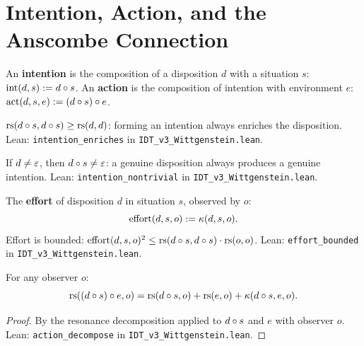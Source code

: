 \section{Intention, Action, and the Anscombe Connection}

\begin{definition}
\label{def:intention-action}
An \textbf{intention} is the composition of a disposition $d$ with a
situation $s$: $\mathrm{int}(d, s) := d \circ s$.
An \textbf{action} is the composition of intention with environment $e$:
$\mathrm{act}(d, s, e) := (d \circ s) \circ e$.
\end{definition}

\begin{theorem}
\label{thm:intention-enriches}
$\mathrm{rs}(d \circ s, d \circ s) \geq \mathrm{rs}(d, d)$: forming an intention
always enriches the disposition.
Lean: \texttt{intention\_enriches} in \texttt{IDT\_v3\_Wittgenstein.lean}.
\end{theorem}

\begin{theorem}
\label{thm:intention-nontrivial}
If $d \neq \varepsilon$, then $d \circ s \neq \varepsilon$: a genuine disposition
always produces a genuine intention.
Lean: \texttt{intention\_nontrivial} in \texttt{IDT\_v3\_Wittgenstein.lean}.
\end{theorem}

\begin{theorem}
\label{thm:effort-decompose}
The \textbf{effort} of disposition $d$ in situation $s$, observed by $o$:
\[
\mathrm{effort}(d, s, o) := \kappa(d, s, o).
\]
Effort is bounded: $\mathrm{effort}(d, s, o)^2 \leq
\mathrm{rs}(d \circ s, d \circ s) \cdot \mathrm{rs}(o, o)$.
Lean: \texttt{effort\_bounded} in \texttt{IDT\_v3\_Wittgenstein.lean}.
\end{theorem}

\begin{theorem}
\label{thm:action-decompose}
For any observer $o$:
\[
\mathrm{rs}((d \circ s) \circ e, o) = \mathrm{rs}(d \circ s, o) + \mathrm{rs}(e, o)
+ \kappa(d \circ s, e, o).
\]
\end{theorem}

\begin{proof}
By the resonance decomposition applied to $d \circ s$ and $e$ with
observer $o$.
Lean: \texttt{action\_decompose} in \texttt{IDT\_v3\_Wittgenstein.lean}.
\end{proof}

